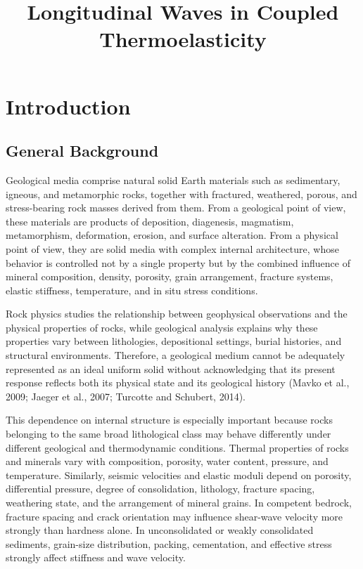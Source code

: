 \documentclass[12pt]{article}
\title{Longitudinal Waves in Coupled Thermoelasticity}
\author{}
\date{}
\begin{document}
\maketitle

\section{Introduction}

\subsection{General Background}

Geological media comprise natural solid Earth materials such as sedimentary, igneous, and metamorphic rocks, together with fractured, weathered, porous, and stress-bearing rock masses derived from them. From a geological point of view, these materials are products of deposition, diagenesis, magmatism, metamorphism, deformation, erosion, and surface alteration. From a physical point of view, they are solid media with complex internal architecture, whose behavior is controlled not by a single property but by the combined influence of mineral composition, density, porosity, grain arrangement, fracture systems, elastic stiffness, temperature, and in situ stress conditions.

Rock physics studies the relationship between geophysical observations and the physical properties of rocks, while geological analysis explains why these properties vary between lithologies, depositional settings, burial histories, and structural environments. Therefore, a geological medium cannot be adequately represented as an ideal uniform solid without acknowledging that its present response reflects both its physical state and its geological history (Mavko et al., 2009; Jaeger et al., 2007; Turcotte and Schubert, 2014).

This dependence on internal structure is especially important because rocks belonging to the same broad lithological class may behave differently under different geological and thermodynamic conditions. Thermal properties of rocks and minerals vary with composition, porosity, water content, pressure, and temperature. Similarly, seismic velocities and elastic moduli depend on porosity, differential pressure, degree of consolidation, lithology, fracture spacing, weathering state, and the arrangement of mineral grains. In competent bedrock, fracture spacing and crack orientation may influence shear-wave velocity more strongly than hardness alone. In unconsolidated or weakly consolidated sediments, grain-size distribution, packing, cementation, and effective stress strongly affect stiffness and wave velocity.
\end{document}
